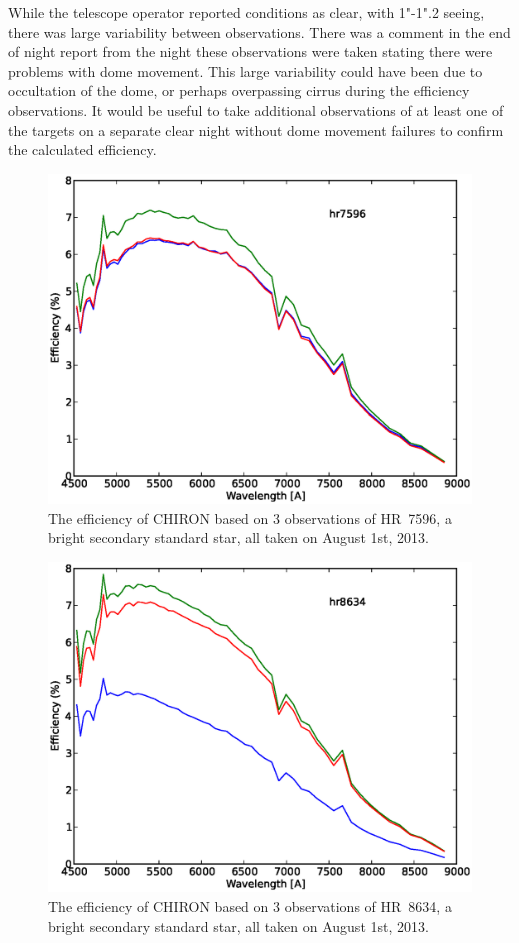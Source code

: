 \documentclass[iop]{emulateapj}
\begin{document}
While the telescope operator reported conditions as clear, with 1"-1".2 seeing, there was large variability between observations. There was a comment in the end of night report from the night these observations were taken stating there were problems with dome movement. This large variability could have been due to occultation of the dome, or perhaps overpassing cirrus during the efficiency observations. It would be useful to take additional observations of at least one of the targets on a separate clear night without dome movement failures to confirm the calculated efficiency.  

\begin{figure}[ht]
\includegraphics[scale=0.4,angle=0]{fig_eff_hr7596_all.eps}
\caption{\label{fig:hr7596} The efficiency of CHIRON based on 3 observations of HR~7596, a bright secondary standard star, all taken on August 1st, 2013.}
\end{figure}

\begin{figure}[ht]
\includegraphics[scale=0.4,angle=0]{fig_eff_hr8634_all.eps}
\caption{\label{fig:hr8634} The efficiency of CHIRON based on 3 observations of HR~8634, a bright secondary standard star, all taken on August 1st, 2013.}
\end{figure}
\end{document}
